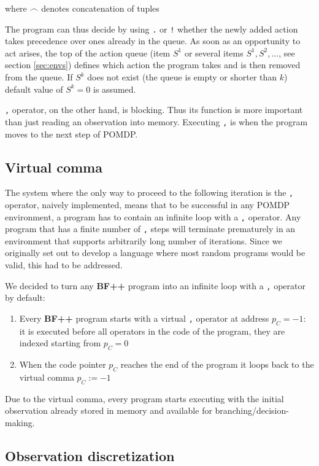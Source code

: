 where $\frown$ denotes concatenation of tuples

The program can thus decide by using \texttt{.} or \texttt{!} whether the newly added action takes precedence over ones already in the queue.
As soon as an opportunity to act arises, the top of the action queue (item $S^1$ or several items $S^1,S^2,\dots$, see section \ref{sec:envs}) defines which action the program takes and is then removed from the queue. 
If $S^k$ does not exist (the queue is empty or shorter than $k$) default value of $S^k=0$ is assumed.

\texttt{,} operator, on the other hand, is blocking. 
Thus its function is more important than just reading an observation into memory.
Executing \texttt{,} is when the program moves to the next step of POMDP.

\subsection{Virtual comma}
\label{sec:virtualcomma}


The system where the only way to proceed to the following iteration is the \texttt{,} operator, naively implemented, means that to be successful in any POMDP environment, a program has to contain an infinite loop with a \texttt{,} operator.
Any program that has a finite number of \texttt{,} steps will terminate prematurely in an environment that supports arbitrarily long number of iterations.
Since we originally set out to develop a language where most random programs would be valid, this had to be addressed.

We decided to turn any \textbf{BF++} program into an infinite loop with a \texttt{,} operator by default:
\begin{enumerate}
    \item Every \textbf{BF++} program starts with a virtual \texttt{,} operator at address $p_C = -1$: it is executed before all operators in the code of the program, they are indexed starting from $p_C = 0$
    \item When the code pointer $p_C$ reaches the end of the program it loops back to the virtual comma $p_C := -1$
\end{enumerate}

Due to the virtual comma, every program starts executing with the initial observation already stored in memory and available for branching/decision-making.

\subsection{Observation discretization}
\label{sec:observe}

